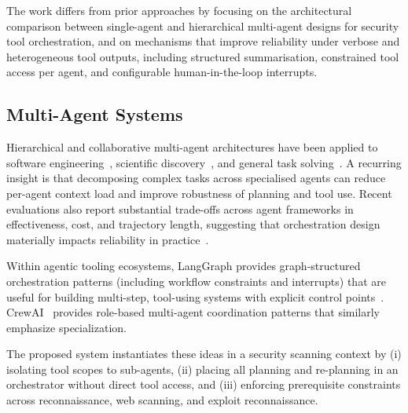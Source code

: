 \documentclass[sigconf,anonymous]{acmart}
\begin{document}
The work differs from prior approaches by focusing on the architectural comparison between single-agent and hierarchical multi-agent designs for security tool orchestration, and on mechanisms that improve reliability under verbose and heterogeneous tool outputs, including structured summarisation, constrained tool access per agent, and configurable human-in-the-loop interrupts.

\subsection{Multi-Agent Systems}

Hierarchical and collaborative multi-agent architectures have been applied to software engineering~\cite{hong2023metagpt}, scientific discovery~\cite{boiko2023emergent}, and general task solving~\cite{wu2023autogen}. A recurring insight is that decomposing complex tasks across specialised agents can reduce per-agent context load and improve robustness of planning and tool use. Recent evaluations also report substantial trade-offs across agent frameworks in effectiveness, cost, and trajectory length, suggesting that orchestration design materially impacts reliability in practice~\cite{yin2025agentframeworks}.

Within agentic tooling ecosystems, LangGraph provides graph-structured orchestration patterns (including workflow constraints and interrupts) that are useful for building multi-step, tool-using systems with explicit control points~\cite{langgraph_workflows_agents}. CrewAI~\cite{crewai2024} provides role-based multi-agent coordination patterns that similarly emphasize specialization.

The proposed system instantiates these ideas in a security scanning context by (i) isolating tool scopes to sub-agents, (ii) placing all planning and re-planning in an orchestrator without direct tool access, and (iii) enforcing prerequisite constraints across reconnaissance, web scanning, and exploit reconnaissance.


\end{document}
